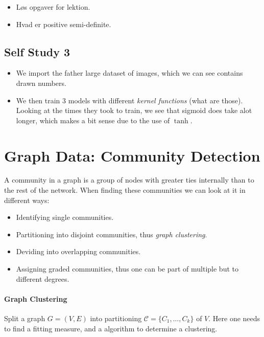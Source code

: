 \begin{mdframed}[frametitle={Questions that Need Answering}]
    \begin{itemize}
        \item Løs opgaver for lektion.
        \item Hvad er positive semi-definite.
    \end{itemize}
\end{mdframed}

\subsection{Self Study 3}

\begin{itemize}
    \item We import the father large dataset of images, which we can see contains drawn numbers.
    \item We then train 3 models with different \emph{kernel functions} (what are those).
        Looking at the times they took to train, we see that sigmoid does take alot longer, which makes a bit sense due to the use of $\tanh$.
\end{itemize}

\section{Graph Data: Community Detection}

A community in a graph is a group of nodes with greater ties internally than to the rest of the network.
When finding these communities we can look at it in different ways:
\begin{itemize}
    \item Identifying single communities.
    \item Partitioning into disjoint communities, thus \emph{graph clustering}.
    \item Deviding into overlapping communities.
    \item Assigning graded communities, thus one can be part of multiple but to different degrees.
\end{itemize}

\paragraph{Graph Clustering}
Split a graph $G = (V, E)$ into partitioning $\mathcal{C} = \{C_1, \dots, C_k\}$ of $V$.
Here one needs to find a fitting measure, and a algorithm to determine a clustering.

